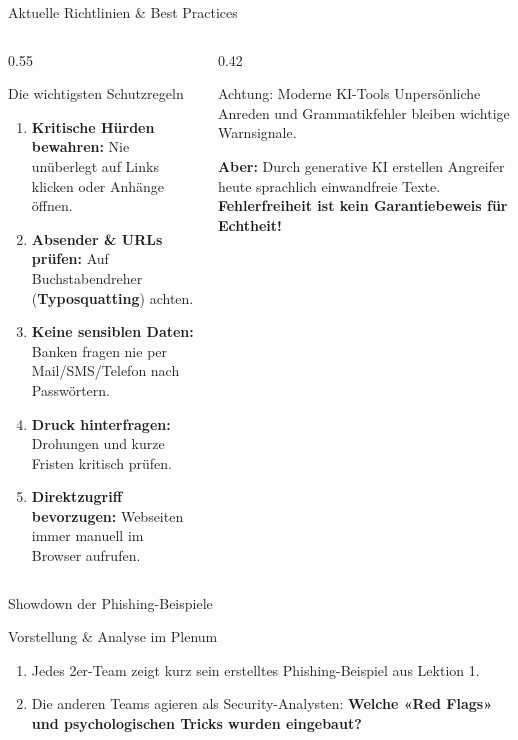 \documentclass[10pt, aspectratio=169]{beamer}
\begin{document}
\begin{frame}{Aktuelle Richtlinien \& Best Practices}
  \pause
  \begin{columns}[T]
    \begin{column}{0.55\textwidth}
      \begin{block}{Die wichtigsten Schutzregeln}
        \small
        \begin{enumerate}
          \pause
          \item \textbf{Kritische Hürden bewahren:} Nie unüberlegt auf Links klicken oder Anhänge öffnen.
          \pause
          \item \textbf{Absender \& URLs prüfen:} Auf Buchstabendreher (\textbf{Typosquatting}) achten.
          \pause
          \item \textbf{Keine sensiblen Daten:} Banken fragen nie per Mail/SMS/Telefon nach Passwörtern.
          \pause
          \item \textbf{Druck hinterfragen:} Drohungen und kurze Fristen kritisch prüfen.
          \pause
          \item \textbf{Direktzugriff bevorzugen:} Webseiten immer manuell im Browser aufrufen.
        \end{enumerate}
      \end{block}
    \end{column}

    \pause
    \begin{column}{0.42\textwidth}
      \begin{alertblock}{Achtung: Moderne KI-Tools}
        \small
        Unpersönliche Anreden und Grammatikfehler bleiben wichtige Warnsignale.
        \vspace{0.6em}

        \textbf{Aber:} Durch generative KI erstellen Angreifer heute sprachlich einwandfreie Texte. \textbf{Fehlerfreiheit ist kein Garantiebeweis für Echtheit!}
      \end{alertblock}
    \end{column}
  \end{columns}
\end{frame}

\begin{frame}{Showdown der Phishing-Beispiele}
  \pause
  \begin{block}{Vorstellung \& Analyse im Plenum}
    \begin{enumerate}
      \item Jedes 2er-Team zeigt kurz sein erstelltes Phishing-Beispiel aus Lektion 1.
      \item Die anderen Teams agieren als Security-Analysten: \textbf{Welche «Red Flags» und psychologischen Tricks wurden eingebaut?}
    \end{enumerate}
  \end{block}
\end{frame}
\end{document}
